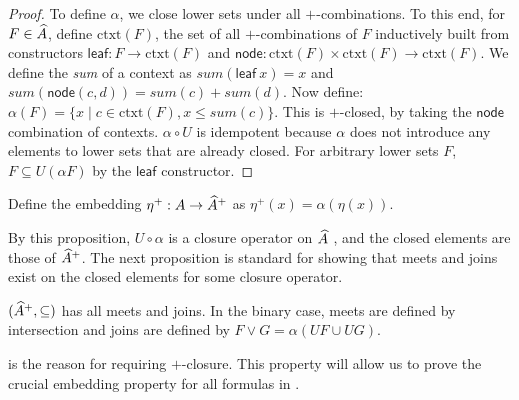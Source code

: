 \begin{proof}
  To define $\alpha$, we close lower sets under all
  $+$-combinations. To this end, for $F \in \widehat{A}$, define
  $\mathrm{ctxt}(F)$, the set of all $+$-combinations of $F$
  inductively built from constructors
  $\mathsf{leaf} : F \to \mathrm{ctxt}(F)$ and
  $\mathsf{node} : \mathrm{ctxt}(F) \times \mathrm{ctxt}(F) \to
    \mathrm{ctxt}(F)$. We define the \emph{sum} of a context as
  $\mathit{sum}(\mathsf{leaf}~x) = x$ and
  $\mathit{sum}(\mathsf{node}(c,d)) = \mathit{sum}(c) +
    \mathit{sum}(d)$. Now define:
  $\alpha(F) = \{ x \mid c \in \mathrm{ctxt}(F), x \leq
    \mathit{sum}(c) \}$. This is $+$-closed, by taking the
  $\mathsf{node}$ combination of contexts. $\alpha \circ U$ is
  idempotent because $\alpha$ does not introduce any elements to lower
  sets that are already closed. For arbitrary lower sets $F$,
  $F \subseteq U(\alpha F)$ by the $\mathsf{leaf}$ constructor.
\end{proof}

\begin{definition}
  Define the embedding $\eta^+ : A \to \widehat{A}^+$ as
  $\eta^+(x) = \alpha(\eta(x))$.
\end{definition}

\begin{remark}
  By this proposition, $U \circ \alpha$ is a closure operator on
  $\widehat{A}$ \cite{davey-priestley}, and the closed elements are
  those of $\widehat{A}^+$. The next proposition is standard for
  showing that meets and joins exist on the closed elements for some
  closure operator.
\end{remark}

\begin{proposition}
  $(\widehat{A}^+, \subseteq)$ has all meets and joins. In the
  binary case, meets are defined by intersection and joins are defined
  by $F \lor G = \alpha (U F \cup U G)$.
\end{proposition}


\begin{remark}
   is the reason for
  requiring $+$-closure. This property will allow us to prove the
  crucial embedding property for all formulas in .
\end{remark}

